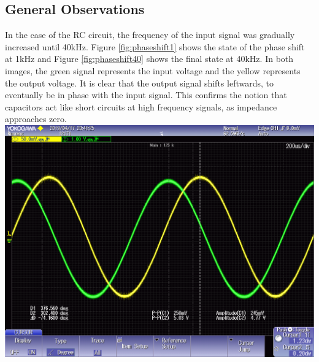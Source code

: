\documentclass[journal]{IEEEtran}
\begin{document}
\subsection{General Observations}

\noindent In the case of the RC circuit, the frequency of the input signal was gradually increased until 40kHz. Figure \ref{fig:phaseshift1} shows the state of the phase shift at 1kHz and Figure \ref{fig:phaseshift40} shows the final state at 40kHz. In both images, the green signal represents the input voltage and the yellow represents the output voltage. It is clear that the output signal shifts leftwards, to eventually be in phase with the input signal. This confirms the notion that capacitors act like short circuits at high frequency signals, as impedance approaches zero.  \\


\begingroup
    \centering
    \medskip
    \includegraphics[width=\columnwidth]{images/lab8_002.png}
    \label{fig:phaseshift1}
    \medskip
\endgroup
\end{document}
